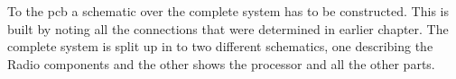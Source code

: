 To the \gls{pcb} a schematic over the complete system has to be constructed. This is built by noting all the connections that were determined in earlier chapter. The complete system is split up in to two different schematics, one describing the Radio components and the other shows the processor and all the other parts.